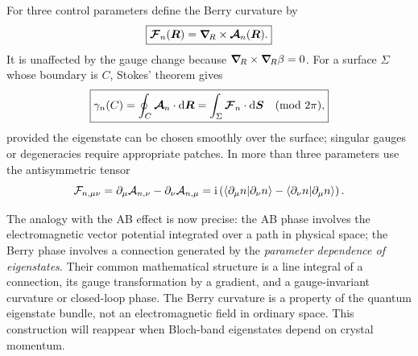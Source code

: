 For three control parameters define the Berry curvature by
\begin{equation}
\boxed{\bm{\mathcal F}_n(\bm{R})
 =\bm{\nabla}_{\!R}\times\bm{\mathcal A}_n(\bm{R}).}
\end{equation}
It is unaffected by the gauge change because $\bm{\nabla}_{\!R}\times\bm{\nabla}_{\!R}\beta=0$. For a surface $\Sigma$ whose boundary is $C$, Stokes' theorem gives
\begin{equation}
\boxed{\gamma_n(C)=\oint_C\vect{\mathcal A}_n\cdot\dd\vect R
=\int_\Sigma\vect{\mathcal F}_n\cdot\dd\vect S\quad(\mathrm{mod}\ 2\pi),}
\end{equation}
provided the eigenstate can be chosen smoothly over the surface; singular gauges or degeneracies require appropriate patches. In more than three parameters use the antisymmetric tensor
\begin{equation}
\mathcal F_{n,\mu\nu}
 =\partial_\mu\mathcal A_{n,\nu}-\partial_\nu\mathcal A_{n,\mu}
 =\mathrm{i}\left(\left\langle\partial_\mu n\middle|\partial_\nu n\right\rangle
           -\left\langle\partial_\nu n\middle|\partial_\mu n\right\rangle\right).
\end{equation}

\begin{center}
\end{center}

The analogy with the AB effect is now precise: the AB phase involves the electromagnetic vector potential integrated over a path in physical space; the Berry phase involves a connection generated by the \emph{parameter dependence of eigenstates}. Their common mathematical structure is a line integral of a connection, its gauge transformation by a gradient, and a gauge-invariant curvature or closed-loop phase. The Berry curvature is a property of the quantum eigenstate bundle, not an electromagnetic field in ordinary space. This construction will reappear when Bloch-band eigenstates depend on crystal momentum.

